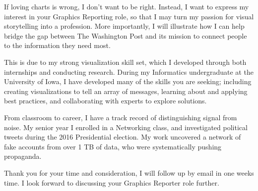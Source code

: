\begin{cvletter}
  If loving charts is wrong, I don’t want to be right.
  Instead, I want to express my interest in your Graphics Reporting role, so that I may turn my passion for visual storytelling into a profession.
  More importantly, I will illustrate how I can help bridge the gap between The Washington Post and its mission to connect people to the information they need most.

  This is due to my strong visualization skill set, which I developed through both internships and conducting research.
  During my Informatics undergraduate at the University of Iowa, I have developed many of the skills you are seeking; including creating visualizations to tell an array of messages, learning about and applying best practices, and collaborating with experts to explore solutions.

  From classroom to career, I have a track record of distinguishing signal from noise.
  My senior year I enrolled in a Networking class, and investigated political tweets during the 2016 Presidential election.
  My work uncovered a network of fake accounts from over 1 TB of data, who were systematically pushing propaganda.

  Thank you for your time and consideration, I will follow up by email in one weeks time.
  I look forward to discussing your Graphics Reporter role further.
\end{cvletter}